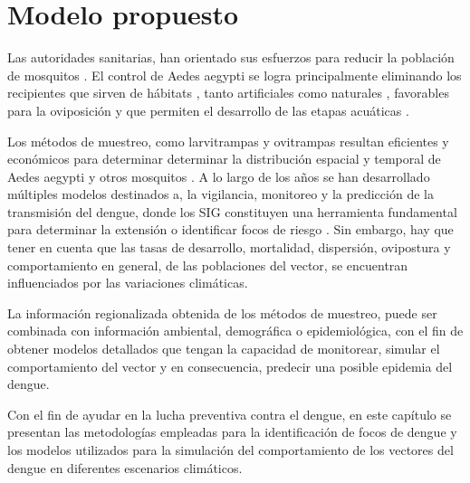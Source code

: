 \chapter{Modelo propuesto}

Las autoridades sanitarias, han orientado sus esfuerzos para reducir la población de mosquitos
\cite{planControlMspbs2014}. El control de Aedes aegypti se logra principalmente eliminando los
recipientes que sirven de hábitats \cite{world2009dengue}, tanto artificiales como naturales
\cite{world2009dengue, directricesDetvArg}, favorables para la oviposición y que permiten el
desarrollo de las etapas acuáticas \cite{world2009dengue}.

Los métodos de muestreo, como larvitrampas y ovitrampas resultan eficientes y económicos para
determinar determinar la distribución espacial y temporal de Aedes aegypti y otros mosquitos
\cite{dengueUruguayCap1, cenaprece2013}. A lo largo de los años se han desarrollado múltiples
modelos destinados a, la vigilancia, monitoreo y la predicción de la transmisión del dengue, donde
los SIG constituyen una herramienta fundamental para determinar la extensión o identificar focos
de riesgo \citep{vgomesAegis2001, NINO2011}. Sin embargo, hay que tener en cuenta que las tasas de
desarrollo, mortalidad, dispersión, ovipostura y comportamiento en general, de las poblaciones del
vector, se encuentran influenciados por las variaciones climáticas.

La información regionalizada obtenida de los métodos de muestreo, puede ser combinada con
información ambiental, demográfica o epidemiológica, con el fin de obtener modelos detallados que
tengan la capacidad de monitorear, simular el comportamiento del vector y en consecuencia,
predecir una posible epidemia del dengue.

Con el fin de ayudar en la lucha preventiva contra el dengue, en este capítulo se presentan las
metodologías empleadas para la identificación de focos de dengue y los modelos utilizados para la
simulación del comportamiento de los vectores del dengue en diferentes escenarios climáticos.




